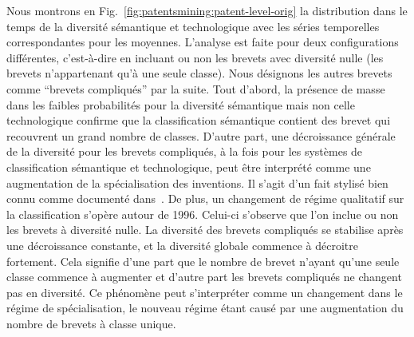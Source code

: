 {Nous montrons en Fig.~\ref{fig:patentsmining:patent-level-orig} la distribution dans le temps de la diversité sémantique et technologique avec les séries temporelles correspondantes pour les moyennes. L'analyse est faite pour deux configurations différentes, c'est-à-dire en incluant ou non les brevets avec diversité nulle (les brevets n'appartenant qu'à une seule classe). Nous désignons les autres brevets comme ``brevets compliqués'' par la suite. Tout d'abord, la présence de masse dans les faibles probabilités pour la diversité sémantique mais non celle technologique confirme que la classification sémantique contient des brevet qui recouvrent un grand nombre de classes. D'autre part, une décroissance générale de la diversité pour les brevets compliqués, à la fois pour les systèmes de classification sémantique et technologique, peut être interprété comme une augmentation de la spécialisation des inventions. Il s'agit d'un fait stylisé bien connu comme documenté dans~\cite{ARCHIBUGI199279}. De plus, un changement de régime qualitatif sur la classification s'opère autour de 1996. Celui-ci s'observe que l'on inclue ou non les brevets à diversité nulle. La diversité des brevets compliqués se stabilise après une décroissance constante, et la diversité globale commence à décroitre fortement. Cela signifie d'une part que le nombre de brevet n'ayant qu'une seule classe commence à augmenter et d'autre part les brevets compliqués ne changent pas en diversité. Ce phénomène peut s'interpréter comme un changement dans le régime de spécialisation, le nouveau régime étant causé par une augmentation du nombre de brevets à classe unique.
}




